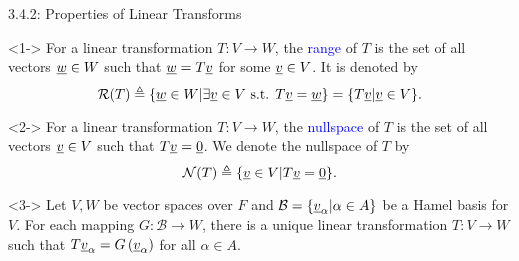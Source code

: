 \documentclass[10pt,letterpaper,english]{beamer}
\begin{document}
\begin{frame}{3.4.2: Properties of Linear Transforms}

\begin{definition}[Range]<1->
For a linear transformation $T\colon V \to W$, the \textcolor{blue}{range} of $T$ is the set of all vectors $\underline{w} \in W$ such that $\underline{w} = T \underline{v}$ for some $\underline{v} \in V$.
It is denoted by
\[ \mathcal{R}(T) \triangleq \{ \underline{w}\in W | \exists \underline{v}\in V \textrm{ s.t. } T\underline{v} = \underline{w} \} = \{ T \underline{v} | \underline{v} \in V\}. \]
\end{definition}

\begin{definition}[Nullspace]<2->
For a linear transformation $T\colon V \to W$, the \textcolor{blue}{nullspace} of $T$ is the set of all vectors $\underline{v} \in V$ such that $T \underline{v} = \underline{0}$.
We denote the nullspace of $T$ by
\[ \mathcal{N}(T) \triangleq \{ \underline{v}\in V | T \underline{v} = \underline{0} \} .\]
\end{definition}

\begin{theorem}<3->
Let $V,W$ be vector spaces over $F$ and $\mathcal{B} = \{ \underline{v}_{\alpha} | \alpha \in A \}$ be a Hamel basis for $V$.
For each mapping $G \colon \mathcal{B} \rightarrow W$, there is a unique linear transformation $T \colon V \rightarrow W$ such that $T \underline{v}_{\alpha} = G \left( \underline{v}_{\alpha} \right)$ for all $\alpha \in A$.
\end{theorem}


\end{frame}
\end{document}
